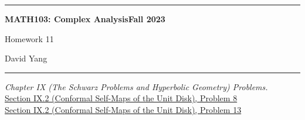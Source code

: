 \documentclass[11pt]{article}
\theoremstyle{definition}
\begin{document}
	\hrule
	\begin{center}
        \textbf{MATH103: Complex Analysis}\hfill \textbf{Fall 2023}\newline


		{\Large Homework 11}

		David Yang
	\end{center}

\hrule

\vspace{1em}


\textit{Chapter IX (The Schwarz Problems and Hyperbolic Geometry) Problems.} \\

\underline{Section IX.2 (Conformal Self-Maps of the Unit Disk), Problem 8}\\

\underline{Section IX.2 (Conformal Self-Maps of the Unit Disk), Problem 13}\\
\end{document}
